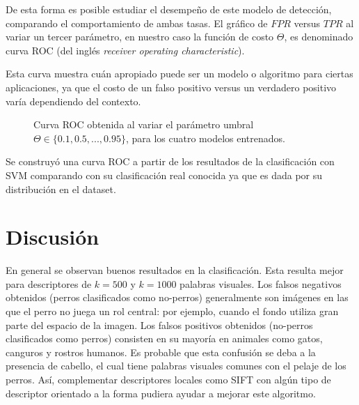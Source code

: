 \documentclass[12pt]{article}
\begin{document}
De esta forma es posible estudiar el desempeño de este modelo de detección, comparando el comportamiento de ambas tasas.
El gráfico de $FPR$ versus $TPR$ al variar un tercer parámetro, en nuestro caso la función de costo $\Theta$, es denominado curva
ROC (del inglés \emph{receiver operating characteristic}).

Esta curva muestra
cuán apropiado puede ser un modelo o algoritmo para ciertas aplicaciones, ya que
el costo de un falso positivo versus un verdadero positivo varía dependiendo del
contexto.

\begin{figure}[h]
    \centering

    \caption{Curva ROC obtenida al variar el parámetro umbral $\Theta \in \{ 0.1,0.5,...,0.95\}$, para los cuatro modelos entrenados.}
\end{figure}

Se construyó una curva ROC a partir de los resultados de la clasificación con SVM comparando con su clasificación real conocida ya que es dada por su distribución en el dataset.

\section{Discusión}

En general se observan buenos resultados en la clasificación. Esta resulta mejor
para descriptores de $k=500$ y $k=1000$ palabras visuales.  Los falsos negativos
obtenidos (perros clasificados como no-perros) generalmente son imágenes en las
que el perro no juega un rol central: por ejemplo, cuando el fondo utiliza gran parte del
espacio de la imagen. Los falsos positivos obtenidos (no-perros clasificados
como perros) consisten en su mayoría en animales como gatos, canguros y rostros
humanos. Es probable que esta confusión se deba a la presencia de cabello, el
cual tiene palabras visuales comunes con el pelaje de los perros. Así,
complementar descriptores locales como SIFT con algún tipo de descriptor
orientado a la forma pudiera ayudar a mejorar este algoritmo.
\end{document}
